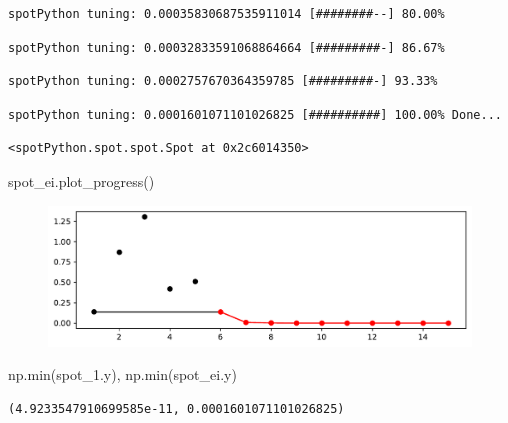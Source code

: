 \documentclass[
  letterpaper,
  DIV=11,
  numbers=noendperiod]{scrreprt}
\newenvironment{Shaded}{\begin{snugshade}}{\end{snugshade}}
\newcommand{\BuiltInTok}[1]{\textcolor[rgb]{0.00,0.23,0.31}{#1}}
\newcommand{\NormalTok}[1]{\textcolor[rgb]{0.00,0.23,0.31}{#1}}
\begin{document}
\begin{verbatim}
spotPython tuning: 0.00035830687535911014 [########--] 80.00% 
\end{verbatim}

\begin{verbatim}
spotPython tuning: 0.00032833591068864664 [#########-] 86.67% 
\end{verbatim}

\begin{verbatim}
spotPython tuning: 0.0002757670364359785 [#########-] 93.33% 
\end{verbatim}

\begin{verbatim}
spotPython tuning: 0.0001601071101026825 [##########] 100.00% Done...
\end{verbatim}

\begin{verbatim}
<spotPython.spot.spot.Spot at 0x2c6014350>
\end{verbatim}

\begin{Shaded}
\begin{Highlighting}[]
\NormalTok{spot\_ei.plot\_progress()}
\end{Highlighting}
\end{Shaded}

\begin{figure}[H]

{\centering \includegraphics{012_num_spot_ei_files/figure-pdf/cell-19-output-1.pdf}

}

\end{figure}

\begin{Shaded}
\begin{Highlighting}[]
\NormalTok{np.}\BuiltInTok{min}\NormalTok{(spot\_1.y), np.}\BuiltInTok{min}\NormalTok{(spot\_ei.y)}
\end{Highlighting}
\end{Shaded}

\begin{verbatim}
(4.9233547910699585e-11, 0.0001601071101026825)
\end{verbatim}
\end{document}
